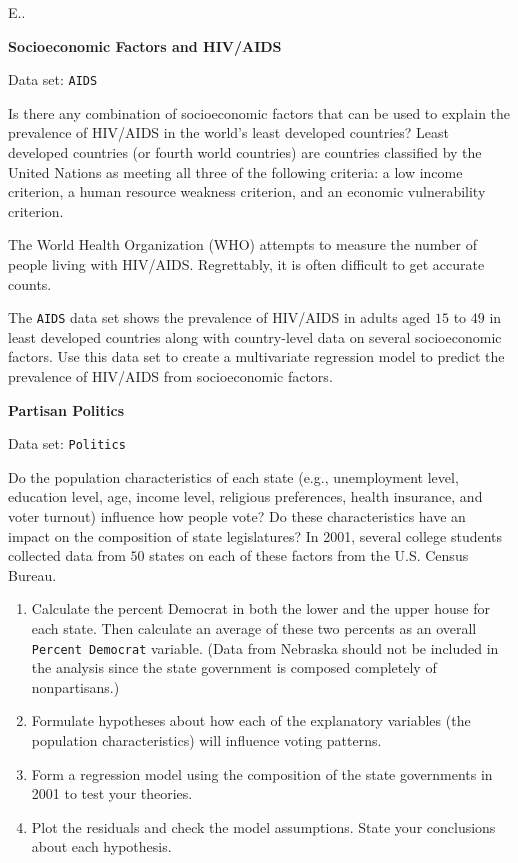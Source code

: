 \documentclass[
]{report}
\newcounter{excount}
\begin{document}
\begin{list}{E..}{ \setlength{\itemsep}{1.2em}}
  \item \textbf{Socioeconomic Factors and HIV/AIDS}

Data set: \texttt{AIDS}

Is there any combination of socioeconomic factors that can be used to explain the prevalence of HIV/AIDS in the world’s least developed countries? Least developed countries (or fourth world countries) are countries classified by the United Nations as meeting all three of the following criteria: a low income criterion, a human resource weakness criterion, and an economic vulnerability criterion.

The World Health Organization (WHO) attempts to measure the number of people living with HIV/AIDS. Regrettably, it is often difficult to get accurate counts.

The \texttt{AIDS} data set shows the prevalence of HIV/AIDS in adults aged $15$ to $49$ in least developed countries along with country-level data on several socioeconomic factors. Use this data set to create a multivariate regression model to predict the prevalence of HIV/AIDS from socioeconomic factors.

  \item \textbf{Partisan Politics}

Data set: \texttt{Politics}

Do the population characteristics of each state (e.g., unemployment level, education level, age, income level, religious preferences, health insurance, and voter turnout) influence how people vote? Do these characteristics have an impact on the composition of state legislatures? In 2001, several college students collected data from $50$ states on each of these factors from the U.S. Census Bureau.

    \begin{enumerate}
      \item Calculate the percent Democrat in both the lower and the upper house for each state. Then calculate an average of these two percents as an overall \texttt{Percent Democrat} variable. (Data from Nebraska should not be included in the analysis since the state government is composed completely of nonpartisans.)
      \item Formulate hypotheses about how each of the explanatory variables (the population characteristics) will influence voting patterns.
      \item Form a regression model using the composition of the state governments in 2001 to test your theories.
      \item Plot the residuals and check the model assumptions. State your conclusions about each hypothesis.
    \end{enumerate}


\end{list}
\end{document}

